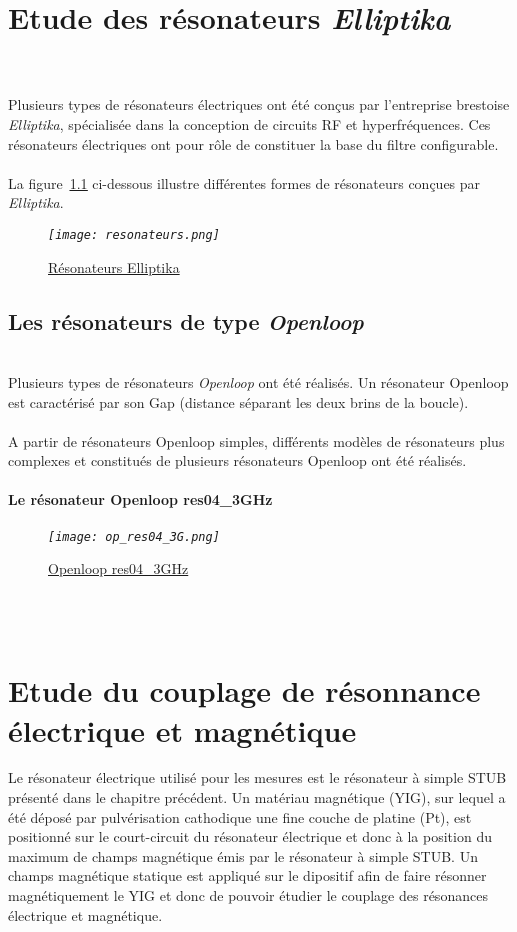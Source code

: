 \documentclass[12pt,fleqn]{book} %
\begin{document}
\setcounter{chapter}{0}
\chapter{Etude des résonateurs \emph{Elliptika}} 
~\\\\\indent Plusieurs types de résonateurs électriques ont été conçus par l'entreprise brestoise \emph{Elliptika}, spécialisée dans la conception de circuits RF et hyperfréquences. Ces résonateurs électriques ont pour rôle de constituer la base du filtre configurable.
~\\\\La figure~\underline{\color{blue}\ref{resonateurs}} ci-dessous illustre différentes formes de résonateurs conçues par \emph{Elliptika}.
\begin{figure}[H]
	\centering
	\itshape
	\texttt{[image: resonateurs.png]}
	\caption{\label{resonateurs} \underline{Résonateurs Elliptika}}
\end{figure}
\section{Les résonateurs de type \emph{Openloop}}
~\\\noindent Plusieurs types de résonateurs \emph{Openloop} ont été réalisés. Un résonateur Openloop est caractérisé par son Gap (distance séparant les deux brins de la boucle). 
~\\\\A partir de résonateurs Openloop simples, différents modèles de résonateurs plus complexes et constitués de plusieurs résonateurs Openloop ont été réalisés. 
~\\
\subsubsection{Le résonateur Openloop res04\_3GHz}
\begin{figure}[H]
	\centering
	\itshape
	\texttt{[image: op\_res04\_3G.png]}
	\caption{\label{op_res04_3G} \underline{Openloop res04\_3GHz}}
\end{figure}
\noindent 

~\\\\
\chapter{Etude du couplage de résonnance électrique et magnétique }
Le résonateur électrique utilisé pour les mesures est le résonateur à simple STUB présenté dans le chapitre précédent. Un matériau magnétique (YIG), sur lequel a été déposé par pulvérisation cathodique une fine couche de platine (Pt), est positionné sur le court-circuit du résonateur électrique et donc à la position du maximum de champs magnétique émis par le résonateur à simple STUB. Un champs magnétique statique est appliqué sur le dipositif afin de faire résonner magnétiquement le YIG et donc de pouvoir étudier le couplage des résonances électrique et magnétique.
\end{document}
